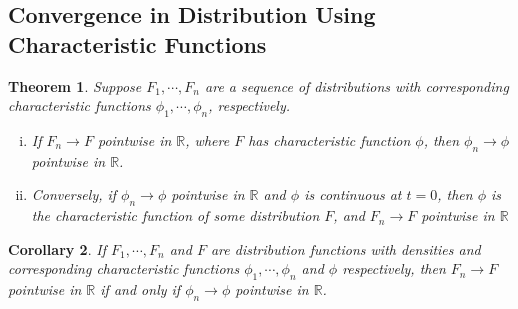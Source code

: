 \documentclass[12pt]{article}
\newcommand{\rr}{\mathbb{R}}
\theoremstyle{plain}
\newtheorem{theorem}{Theorem}
\newtheorem{corollary}[theorem]{Corollary}
\theoremstyle{definition}
\newtheorem*{definition}{Definition}
\theoremstyle{remark}
\numberwithin{equation}{section}  %
\begin{document}
\subsection{Convergence in Distribution Using Characteristic Functions}
\begin{theorem}\label{thm:conv-char-dist}
	Suppose $F_{1}, \cdots, F_{n}$ are a sequence of distributions
	with corresponding characteristic functions
	$\phi_{1}, \cdots, \phi_{n}$, respectively. 
	\begin{enumerate}[(i)]
		\item If $F_{n} \to F$ pointwise in $\rr$,
			where $F$ has characteristic function
			$\phi$, then $\phi_{n} \to \phi$ pointwise in $\rr$.
		\item Conversely, if  $\phi_{n} \to \phi$ pointwise in $\rr$ and 
			$\phi$ is continuous at $t = 0$, then $\phi$ is the characteristic
			function of some distribution $F$, and $F_{n} \to F$ pointwise
			in $\rr$
	\end{enumerate}
\end{theorem}
\begin{corollary}
	If $F_{1}, \cdots, F_{n}$ and $F$ are distribution functions with densities
	and corresponding characteristic functions $\phi_{1}, \cdots, \phi_{n}$ and
	$\phi$ respectively, then $F_{n} \to F$ pointwise in $\rr$ if and only if
	$\phi_{n} \to \phi$ pointwise in $\rr$.
\end{corollary}
\end{document}
